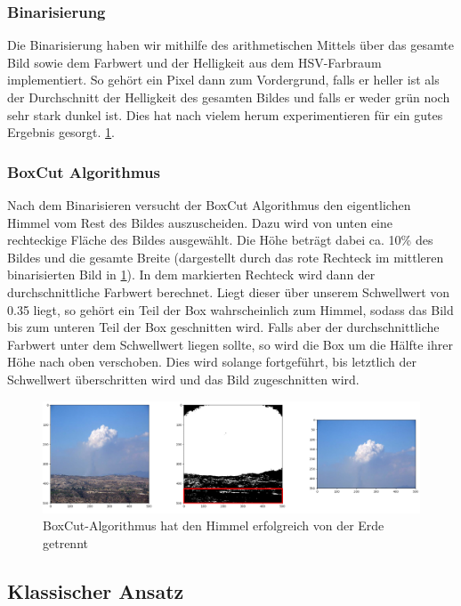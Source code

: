\documentclass[a4,german]{article}
\begin{document}
\subsubsection{Binarisierung} 
\label{sec:binary}
Die Binarisierung haben wir mithilfe des arithmetischen Mittels über das gesamte Bild sowie dem Farbwert und der Helligkeit aus dem HSV-Farbraum implementiert.
So gehört  ein Pixel dann zum Vordergrund, falls er heller ist als der Durchschnitt der Helligkeit des gesamten Bildes und falls er weder grün noch sehr stark dunkel ist.
Dies hat nach vielem herum experimentieren für ein gutes Ergebnis gesorgt. \ref{fig:boxAlg}.

\subsubsection{BoxCut Algorithmus}
\label{sec:boxcut}
Nach dem Binarisieren versucht der BoxCut Algorithmus den eigentlichen Himmel vom Rest des Bildes auszuscheiden. Dazu wird von unten eine rechteckige Fläche des Bildes ausgewählt. Die Höhe beträgt dabei ca. 10\%
des Bildes und die gesamte Breite (dargestellt durch das rote Rechteck im mittleren binarisierten Bild in \ref{fig:boxAlg}). In dem markierten Rechteck wird dann der durchschnittliche Farbwert berechnet.
Liegt dieser über unserem Schwellwert von 0.35 liegt, so gehört ein Teil der Box wahrscheinlich zum Himmel, sodass das Bild bis zum unteren Teil der Box geschnitten wird.
Falls aber der durchschnittliche Farbwert unter dem Schwellwert liegen sollte, so wird die Box um die Hälfte ihrer Höhe nach oben verschoben. Dies wird solange fortgeführt, bis letztlich der Schwellwert überschritten wird und das Bild zugeschnitten wird.


\begin{figure}[h!]
\centering
\includegraphics[width=1.1\textwidth]{boxAlg}
\caption{BoxCut-Algorithmus hat den Himmel erfolgreich von der Erde getrennt}
\label{fig:boxAlg}
\end{figure}


\subsection{Klassischer Ansatz}
\end{document}
